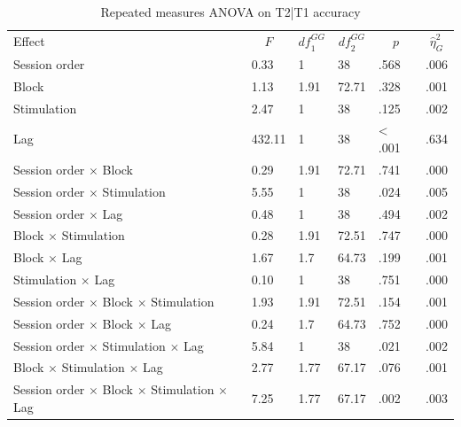 \documentclass[11pt,]{memoir}
\makeatletter
\newcommand\LastLTentrywidth{1em}
\newlength\longtablewidth
\newcommand{\getlongtablewidth}{\begingroup \ifcsname LT@\roman{LT@tables}\endcsname \global\longtablewidth=0pt \renewcommand{\LT@entry}[2]{\global\advance\longtablewidth by ##2\relax\gdef\LastLTentrywidth{##2}}\@nameuse{LT@\roman{LT@tables}} \fi \endgroup}
\makeatother
\begin{document}
\begin{center}
\begin{ThreePartTable}
\small{
\begin{longtable}{llllll}\noalign{\getlongtablewidth\global\LTcapwidth=\longtablewidth}
\caption{\label{tab:tab-anova-T2}Repeated measures ANOVA on T2|T1 accuracy}\\
\toprule
Effect & \multicolumn{1}{c}{$F$} & \multicolumn{1}{c}{$\mathit{df}_1^{GG}$} & \multicolumn{1}{c}{$\mathit{df}_2^{GG}$} & \multicolumn{1}{c}{$p$} & \multicolumn{1}{c}{$\hat{\eta}^2_G$}\\
\midrule
Session order & 0.33 & 1 & 38 & .568 & .006\\
Block & 1.13 & 1.91 & 72.71 & .328 & .001\\
Stimulation & 2.47 & 1 & 38 & .125 & .002\\
Lag & 432.11 & 1 & 38 & < .001 & .634\\
Session order $\times$ Block & 0.29 & 1.91 & 72.71 & .741 & .000\\
Session order $\times$ Stimulation & 5.55 & 1 & 38 & .024 & .005\\
Session order $\times$ Lag & 0.48 & 1 & 38 & .494 & .002\\
Block $\times$ Stimulation & 0.28 & 1.91 & 72.51 & .747 & .000\\
Block $\times$ Lag & 1.67 & 1.7 & 64.73 & .199 & .001\\
Stimulation $\times$ Lag & 0.10 & 1 & 38 & .751 & .000\\
Session order $\times$ Block $\times$ Stimulation & 1.93 & 1.91 & 72.51 & .154 & .001\\
Session order $\times$ Block $\times$ Lag & 0.24 & 1.7 & 64.73 & .752 & .000\\
Session order $\times$ Stimulation $\times$ Lag & 5.84 & 1 & 38 & .021 & .002\\
Block $\times$ Stimulation $\times$ Lag & 2.77 & 1.77 & 67.17 & .076 & .001\\
Session order $\times$ Block $\times$ Stimulation $\times$ Lag & 7.25 & 1.77 & 67.17 & .002 & .003\\
\bottomrule
\end{longtable}
}
\end{ThreePartTable}
\end{center}

\endgroup

\begingroup
\setlength{\LTleft}{-20cm plus -1fill}
\setlength{\LTright}{\LTleft}
\end{document}
